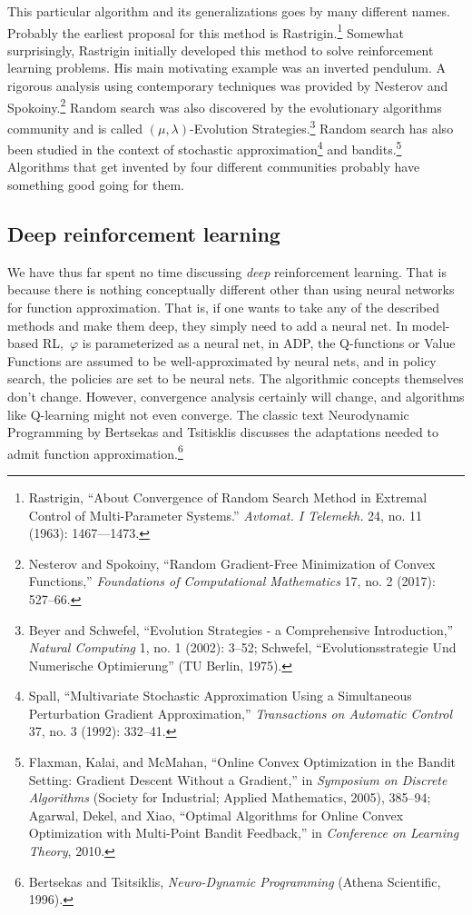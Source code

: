 \documentclass{tufte-book}
\begin{document}
This particular algorithm and its generalizations goes by many different
names. Probably the earliest proposal for this method is
Rastrigin.\footnote{Rastrigin, {``About Convergence of Random Search
  Method in Extremal Control of Multi-Parameter Systems.''}
  \emph{Avtomat. I Telemekh.} 24, no. 11 (1963): 1467---1473.} Somewhat
surprisingly, Rastrigin initially developed this method to solve
reinforcement learning problems. His main motivating example was an
inverted pendulum. A rigorous analysis using contemporary techniques was
provided by Nesterov and Spokoiny.\footnote{Nesterov and Spokoiny,
  {``Random Gradient-Free Minimization of Convex Functions,''}
  \emph{Foundations of Computational Mathematics} 17, no. 2 (2017):
  527--66.} Random search was also discovered by the evolutionary
algorithms community and is called \((\mu,\lambda)\)-Evolution
Strategies.\footnote{Beyer and Schwefel, {``{Evolution Strategies} - a
  Comprehensive Introduction,''} \emph{Natural Computing} 1, no. 1
  (2002): 3--52; Schwefel, {``Evolutionsstrategie Und Numerische
  Optimierung''} (TU Berlin, 1975).} Random search has also been studied
in the context of stochastic approximation\footnote{Spall,
  {``Multivariate Stochastic Approximation Using a Simultaneous
  Perturbation Gradient Approximation,''} \emph{Transactions on
  Automatic Control} 37, no. 3 (1992): 332--41.} and bandits.\footnote{Flaxman,
  Kalai, and McMahan, {``Online Convex Optimization in the Bandit
  Setting: Gradient Descent Without a Gradient,''} in \emph{Symposium on
  Discrete Algorithms} (Society for Industrial; Applied Mathematics,
  2005), 385--94; Agarwal, Dekel, and Xiao, {``Optimal Algorithms for
  Online Convex Optimization with Multi-Point Bandit Feedback,''} in
  \emph{Conference on Learning Theory}, 2010.} Algorithms that get
invented by four different communities probably have something good
going for them.

\hypertarget{deep-reinforcement-learning}{%
\subsection{Deep reinforcement
learning}\label{deep-reinforcement-learning}}


We have thus far spent no time discussing \emph{deep} reinforcement
learning. That is because there is nothing conceptually different other
than using neural networks for function approximation. That is, if one
wants to take any of the described methods and make them deep, they
simply need to add a neural net. In model-based RL,~\(\varphi\) is
parameterized as a neural net, in ADP, the Q-functions or Value
Functions are assumed to be well-approximated by neural nets, and in
policy search, the policies are set to be neural nets. The algorithmic
concepts themselves don't change. However, convergence analysis
certainly will change, and algorithms like Q-learning might not even
converge. The classic text Neurodynamic Programming by Bertsekas and
Tsitisklis discusses the adaptations needed to admit function
approximation.\footnote{Bertsekas and Tsitsiklis, \emph{Neuro-Dynamic
  Programming} (Athena Scientific, 1996).}
\end{document}

